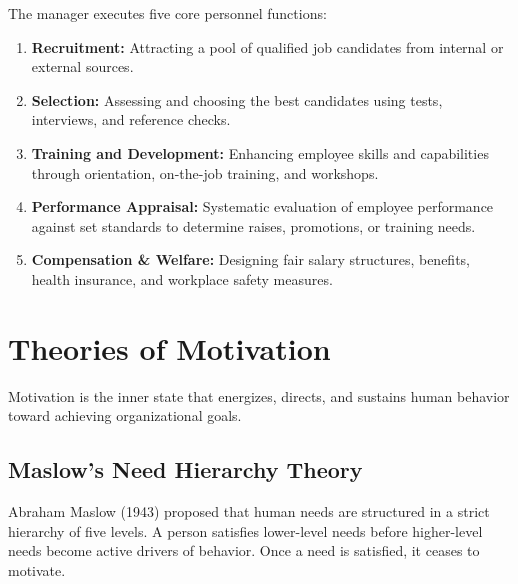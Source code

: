 \documentclass[12pt,a4paper]{article}
\begin{document}
The manager executes five core personnel functions:
\begin{enumerate}[label=\textbf{\arabic*.}, leftmargin=*, itemsep=3.5pt]
  \item \textbf{Recruitment:} Attracting a pool of qualified job candidates from internal or external sources.
  \item \textbf{Selection:} Assessing and choosing the best candidates using tests, interviews, and reference checks.
  \item \textbf{Training and Development:} Enhancing employee skills and capabilities through orientation, on-the-job training, and workshops.
  \item \textbf{Performance Appraisal:} Systematic evaluation of employee performance against set standards to determine raises, promotions, or training needs.
  \item \textbf{Compensation \& Welfare:} Designing fair salary structures, benefits, health insurance, and workplace safety measures.
\end{enumerate}

\section{Theories of Motivation}

Motivation is the inner state that energizes, directs, and sustains human behavior toward achieving organizational goals.

\subsection{Maslow's Need Hierarchy Theory}
Abraham Maslow (1943) proposed that human needs are structured in a strict hierarchy of five levels. A person satisfies lower-level needs before higher-level needs become active drivers of behavior. Once a need is satisfied, it ceases to motivate.
\end{document}
